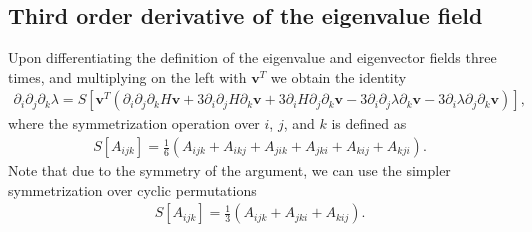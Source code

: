 \documentclass{article}
\begin{document}
\subsection{Third order derivative of the eigenvalue field}
Upon differentiating the definition of the eigenvalue and eigenvector fields three times, and multiplying on the left with $\bm{v}^T$ we obtain the identity
\begin{align}
\partial_i \partial_j \partial_k \lambda = S[\bm{v}^T(
\partial_i \partial_j \partial_k H \bm{v} 
+3 \partial_i \partial_j H \partial_k \bm{v} 
+3 \partial_i H \partial_j \partial_k \bm{v} 
-3 \partial_i \partial_j \lambda \partial_k \bm{v} 
-3 \partial_i \lambda \partial_j \partial_k \bm{v})],
\end{align}
where the symmetrization operation over $i$, $j$, and $k$ is defined as
\begin{align}
S[A_{ijk}] = \frac{1}{6}(A_{ijk} + A_{ikj} + A_{jik} + A_{jki} + A_{kij} + A_{kji}).
\end{align}
Note that due to the symmetry of the argument, we can use the simpler symmetrization over cyclic permutations
\begin{align}
S[A_{ijk}] = \frac{1}{3}(A_{ijk} + A_{jki} + A_{kij}).
\end{align}
\end{document}
